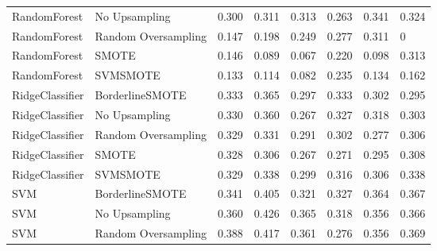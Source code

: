 \begin{tabular}{llllllll}
                RandomForest &       No Upsampling & 0.300 &                     0.311 &                 0.313 &                  0.263 &                                   0.341 &     0.324 \\
                RandomForest & Random Oversampling & 0.147 &                     0.198 &                 0.249 &                  0.277 &                                   0.311 &         0 \\
                RandomForest &               SMOTE & 0.146 &                     0.089 &                 0.067 &                  0.220 &                                   0.098 &     0.313 \\
                RandomForest &            SVMSMOTE & 0.133 &                     0.114 &                 0.082 &                  0.235 &                                   0.134 &     0.162 \\
             RidgeClassifier &     BorderlineSMOTE & 0.333 &                     0.365 &                 0.297 &                  0.333 &                                   0.302 &     0.295 \\
             RidgeClassifier &       No Upsampling & 0.330 &                     0.360 &                 0.267 &                  0.327 &                                   0.318 &     0.303 \\
             RidgeClassifier & Random Oversampling & 0.329 &                     0.331 &                 0.291 &                  0.302 &                                   0.277 &     0.306 \\
             RidgeClassifier &               SMOTE & 0.328 &                     0.306 &                 0.267 &                  0.271 &                                   0.295 &     0.308 \\
             RidgeClassifier &            SVMSMOTE & 0.329 &                     0.338 &                 0.299 &                  0.316 &                                   0.306 &     0.338 \\
                         SVM &     BorderlineSMOTE & 0.341 &                     0.405 &                 0.321 &                  0.327 &                                   0.364 &     0.367 \\
                         SVM &       No Upsampling & 0.360 &                     0.426 &                 0.365 &                  0.318 &                                   0.356 &     0.366 \\
                         SVM & Random Oversampling & 0.388 &                     0.417 &                 0.361 &                  0.276 &                                   0.356 &     0.369 \\

\end{tabular}
